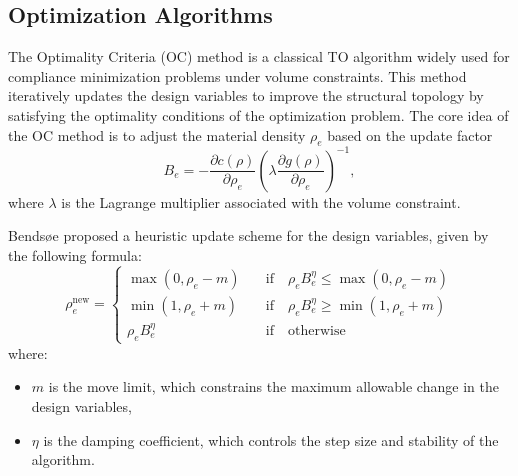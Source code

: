 \documentclass[mathpazo]{cicp}
\begin{document}

\subsection{Optimization Algorithms}
The Optimality Criteria (OC) method is a classical TO algorithm widely used for compliance minimization problems under volume constraints. This method iteratively updates the design variables to improve the structural topology by satisfying the optimality conditions of the optimization problem. The core idea of the OC method is to adjust the material density $\rho_e$ based on the update factor
\begin{equation*}
	B_e = -\frac{\partial{c}(\rho)}{\partial\rho_e}\left(\lambda\frac{\partial{g}(\rho)}{\partial\rho_e}\right)^{-1},
\end{equation*}
where $\lambda$ is the Lagrange multiplier associated with the volume constraint.
 
Bendsøe \cite{bendsoe1995optimization} proposed a heuristic update scheme for the design variables, given by the following formula:
\begin{equation*}
	\rho_e^{\mathrm{new}}=
	\begin{cases}
		\max(0,\rho_e-m)\quad&\text{if}\quad \rho_eB_e^\eta\leq\max(0,\rho_e-m)\\
		\min(1,\rho_e+m)\quad&\text{if}\quad\rho_eB_e^\eta \geq \min(1,\rho_e+m)\\
		\rho_eB_e^\eta\quad&\text{if}\quad\text{otherwise}
	\end{cases}
\end{equation*}
where: 
\begin{itemize} 
	\item $m$ is the move limit, which constrains the maximum allowable change in the design variables,
	\item $\eta$ is the damping coefficient, which controls the step size and stability of the algorithm. 
\end{itemize}
\end{document}
